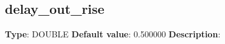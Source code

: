 \subsection*{delay_out_rise}
\textbf{Type}: DOUBLE\newline
\textbf{Default value}: 0.500000\newline
\textbf{Description}: